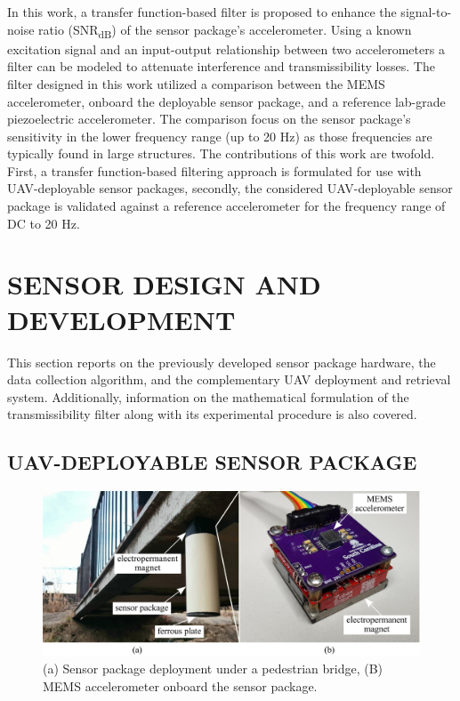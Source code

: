 \documentclass[]{spie}  %
\begin{document}
In this work, a transfer function-based filter is proposed to enhance the signal-to-noise ratio (SNR\textsubscript{dB}) of the sensor package’s accelerometer. Using a known excitation signal and an input-output relationship between two accelerometers a filter can be modeled to attenuate interference and transmissibility losses\cite{BADRI2010}. The filter designed in this work utilized a comparison between the MEMS accelerometer, onboard the deployable sensor package, and a reference lab-grade piezoelectric accelerometer. The comparison focus on the sensor package's sensitivity in the lower frequency range (up to 20 Hz) as those frequencies are typically found in large structures\cite{KARPEL1997}. The contributions of this work are twofold. First, a transfer function-based filtering approach is formulated for use with UAV-deployable sensor packages, secondly,  the considered UAV-deployable sensor package is validated against a reference accelerometer for the frequency range of DC to 20 Hz.


	
	
	\section{SENSOR DESIGN AND DEVELOPMENT}

This section reports on the previously developed sensor package hardware, the data collection algorithm, and the complementary UAV deployment and retrieval system. Additionally, information on the mathematical formulation of the transmissibility filter along with its experimental procedure is also covered.

		\subsection{UAV-DEPLOYABLE SENSOR PACKAGE}

	\begin{figure} [H]
	\centering
	\includegraphics[width=6 in]{figures/MEMS.png}
	\caption{(a) Sensor package deployment under a pedestrian bridge, (B) MEMS accelerometer onboard the sensor package.}
	\label{fig:MEMS} 
	\end{figure} 	
	
\end{document}
